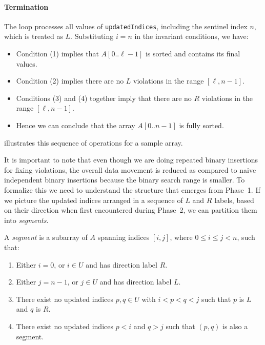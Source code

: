 \paragraph{Termination} The loop processes all values of \texttt{updatedIndices}, including the sentinel index $n$, which is treated as $L$. Substituting $i = n$ in the invariant conditions, we have:
\begin{itemize}
  \item Condition (1) implies that $A[0..\ell-1]$ is sorted and contains its final values.
  \item Condition (2) implies there are no $L$ violations in the range $[\ell, n-1]$.
  \item Conditions (3) and (4) together imply that there are no $R$ violations in the range $[\ell, n-1]$.
  \item Hence we can conclude that the array $A[0..n-1]$ is fully sorted.
\end{itemize}

 illustrates this sequence of operations for a sample array.

It is important to note that even though we are doing repeated binary insertions for fixing violations, the overall data movement is reduced as compared to naive independent binary insertions because the binary search range is smaller. To formalize this we need to understand the structure that emerges from Phase~1. If we picture the updated indices arranged in a sequence of $L$ and $R$ labels, based on their direction when first encountered during Phase~2, we can partition them into \emph{segments}.

\begin{definition}[Segment]
\label{def:segment}
A \emph{segment} is a subarray of $A$ spanning indices $[i, j]$, where $0 \le i \le j < n$, such that:
\begin{enumerate}
  \item Either $i = 0$, or $i \in U$ and has direction label $R$.
  \item Either $j = n - 1$, or $j \in U$ and has direction label $L$.
  \item There exist no updated indices $p, q \in U$ with $i < p < q < j$ such that $p$ is $L$ and $q$ is $R$.
  \item There exist no updated indices $p < i$ and $q > j$ such that $(p, q)$ is also a segment.
\end{enumerate}
\end{definition}

